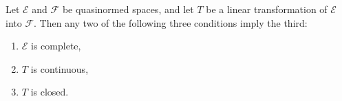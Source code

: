 Let $\mathcal{E}$ and $\mathcal{F}$ be quasinormed spaces, and let $T$ be a linear transformation of $\mathcal{E}$ into $\mathcal{F}$. Then any two of the following three conditions imply the third:
\begin{enumerate}
\item[(i)] $\mathcal{E}$ is complete,
\item[(ii)] $T$ is continuous,
\item[(iii)] $T$ is closed.
\end{enumerate}
